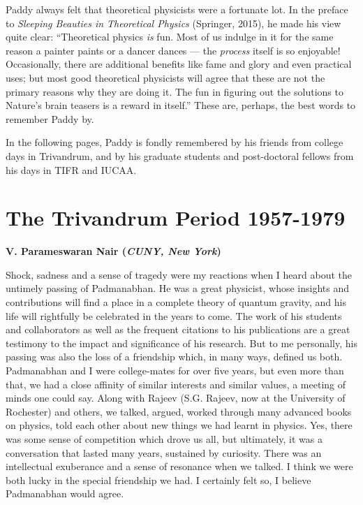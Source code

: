 \documentclass[prd, preprint, longbibliography, 11pt]{revtex4-1}
\begin{document}
Paddy always felt that theoretical physicists were a fortunate lot.
In the preface to  \textit{Sleeping Beauties in Theoretical Physics}
(Springer, 2015), he made his view quite clear: ``Theoretical physics
\textit{is}  fun.
Most of us indulge in it for the same reason a painter paints or a
dancer dances --- the \textit{process} itself is so enjoyable!
Occasionally, there are additional benefits like fame and glory and
even practical uses; but most good theoretical physicists will agree
that these are not the primary reasons why they are doing it.
The fun in figuring out the solutions to Nature's brain teasers is a
reward in itself.'' 
These are, perhaps, the best words to remember Paddy by.

\smallskip


 In the following pages, Paddy is fondly remembered by his friends from college days in Trivandrum, and by  his graduate students and post-doctoral fellows from his days in TIFR and IUCAA.

\section{The Trivandrum Period 1957-1979}
\smallskip
\centerline{\bf {V. Parameswaran Nair} ({\it CUNY, New York})}
\medskip
\noindent Shock, sadness and a sense of tragedy were my reactions when I heard about the untimely passing of Padmanabhan. He was a great physicist, whose insights and contributions will find a place in a complete theory of quantum gravity, and his life will rightfully be celebrated in the years to come. The work of his students and collaborators as well as the frequent citations to his publications are a great testimony to the impact and significance of his research.  But to me personally, his passing was also the loss of a friendship which, in many ways, defined us both. Padmanabhan and I were college-mates for over five years, but even more than that, we had a close affinity of similar interests and similar values, a meeting of minds one could say. 
Along with Rajeev (S.G. Rajeev, now at the University of Rochester) and others, we talked, argued, worked through many advanced books on physics, told each other about new things we had learnt in physics. Yes, there was some sense of competition which drove us all, but ultimately, it was a conversation that lasted many years, sustained by curiosity. There was an intellectual exuberance and a sense of resonance when we talked. I think we were 
both lucky in the special friendship we had. I certainly felt so, I believe Padmanabhan would agree. 
\end{document}
